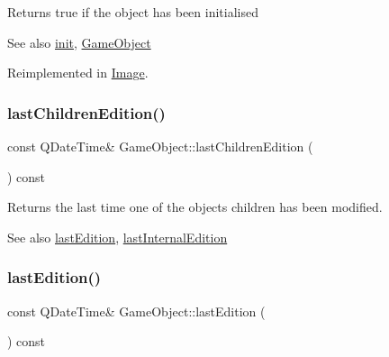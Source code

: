 Returns true if the object has been initialised

\begin{DoxySeeAlso}{See also}
\hyperlink{class_game_object_a97be7b59b2e76e7d60de2146b894eed9}{init}, \hyperlink{class_game_object_ab00c537faf6eb4439c60003141a763b9}{Game\+Object} 
\end{DoxySeeAlso}


Reimplemented in \hyperlink{class_image_ac78aa7b47e7a8b279d2e95ac309ab375}{Image}.

\hypertarget{class_game_object_a83b0ea6d2c30edf0b70d3a9e2e80563b}{}\label{class_game_object_a83b0ea6d2c30edf0b70d3a9e2e80563b} 
\subsubsection{\texorpdfstring{last\+Children\+Edition()}{lastChildrenEdition()}}
{\footnotesize\ttfamily const Q\+Date\+Time\& Game\+Object\+::last\+Children\+Edition (\begin{DoxyParamCaption}{ }\end{DoxyParamCaption}) const\hspace{0.3cm}{\ttfamily [inline]}}

Returns the last time one of the object\textquotesingle{}s children has been modified.

\begin{DoxySeeAlso}{See also}
\hyperlink{class_game_object_a060fb833acf28832fa85a7927227bdde}{last\+Edition}, \hyperlink{class_game_object_a76035507be4203cc72186f210a9c4fee}{last\+Internal\+Edition} 
\end{DoxySeeAlso}
\hypertarget{class_game_object_a060fb833acf28832fa85a7927227bdde}{}\label{class_game_object_a060fb833acf28832fa85a7927227bdde} 
\subsubsection{\texorpdfstring{last\+Edition()}{lastEdition()}}
{\footnotesize\ttfamily const Q\+Date\+Time\& Game\+Object\+::last\+Edition (\begin{DoxyParamCaption}{ }\end{DoxyParamCaption}) const\hspace{0.3cm}{\ttfamily [inline]}}

